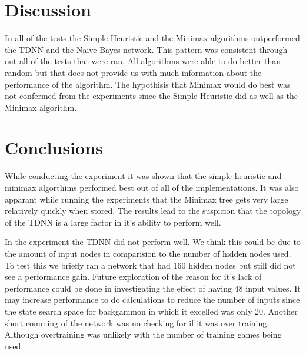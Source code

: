 \documentclass[12pt,letterpaper]{article}
\begin{document}
\clearpage

\section{Discussion}
In all of the tests the Simple Heuristic and the Minimax algorithms outperformed the TDNN and the Naive Bayes network. This pattern was consistent through out all of the tests that were ran. All algorithms were able to do better than random but that does not provide us with much information about the performance of the algorithm. The hypothisis that Minimax would do best was not confermed from the experiments since the Simple Heuristic did as well as the Minimax algorithm. 

\section{Conclusions}
While conducting the experiment it was shown that the simple heuristic and minimax algorthims performed best out of all of the implementations. It was also apparant while running the experiments that the Minimax tree gets very large relatively quickly when stored. The results lead to the suspicion that the topology of the TDNN is a large factor in it's ability to perform well.

In the experiment the TDNN did not perform well. We think this could be due to the amount of input nodes in comparision to the number of hidden nodes used. To test this we briefly ran a network that had 160 hidden nodes but still did not see a performance gain. Future exploration of the reason for it's lack of performance could be done in investigating the effect of having 48 input values. It may increase performance to do calculations to reduce the number of inputs since the state search space for backgammon in which it excelled was only 20. Another short comming of the network was no checking for if it was over training. Although overtraining was unlikely with the number of training games being used.



\newpage



\nocite{*}
\end{document}
